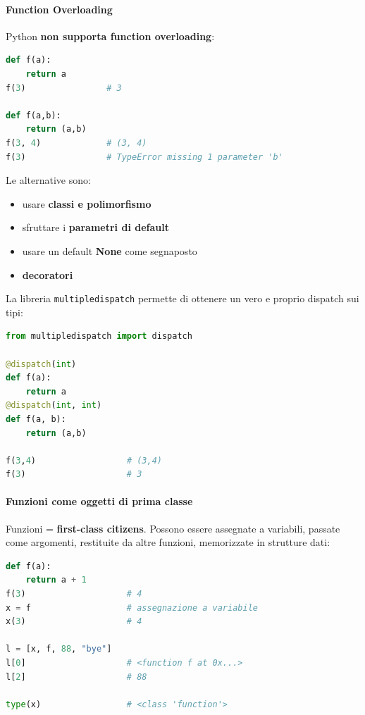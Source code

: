 \documentclass[12pt]{extarticle}
\begin{document}
\paragraph{Function Overloading} Python \textbf{non supporta function overloading}:
\begin{lstlisting}[language=Python]
def f(a):
    return a
f(3)                # 3

def f(a,b):
    return (a,b)
f(3, 4)             # (3, 4)
f(3)                # TypeError missing 1 parameter 'b'
\end{lstlisting}
Le alternative sono:
\begin{itemize}
    \item usare \textbf{classi e polimorfismo}
    \item sfruttare i \textbf{parametri di default}
    \item usare un default \textbf{None} come segnaposto
    \item \textbf{decoratori}
\end{itemize}
La libreria \texttt{multipledispatch} permette di ottenere un vero e proprio dispatch sui tipi:
\begin{lstlisting}[language=Python]
from multipledispatch import dispatch

@dispatch(int)
def f(a):
    return a
@dispatch(int, int)
def f(a, b):
    return (a,b)

f(3,4)                  # (3,4)
f(3)                    # 3
\end{lstlisting}

\paragraph{Funzioni come oggetti di prima classe} Funzioni = \textbf{first-class citizens}. Possono essere assegnate a variabili, passate come argomenti, restituite da altre funzioni, memorizzate in strutture dati:
\begin{lstlisting}[language=Python]
def f(a):
    return a + 1
f(3)                    # 4
x = f                   # assegnazione a variabile
x(3)                    # 4

l = [x, f, 88, "bye"]
l[0]                    # <function f at 0x...>
l[2]                    # 88

type(x)                 # <class 'function'>
\end{lstlisting}
\end{document}
